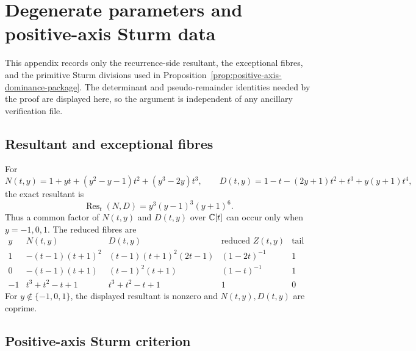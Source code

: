 \section{Degenerate parameters and positive-axis Sturm data}\label{app:degeneracies}

This appendix records only the recurrence-side resultant, the exceptional fibres, and the primitive Sturm divisions used in Proposition~\ref{prop:positive-axis-dominance-package}.  The determinant and pseudo-remainder identities needed by the proof are displayed here, so the argument is independent of any ancillary verification file.

\subsection{Resultant and exceptional fibres}

For
\[
N(t,y)=1+yt+(y^2-y-1)t^2+(y^3-2y)t^3,
\qquad
D(t,y)=1-t-(2y+1)t^2+t^3+y(y+1)t^4,
\]
the exact resultant is
\[
\operatorname{Res}_t(N,D)=y^3(y-1)^3(y+1)^6.
\]
Thus a common factor of \(N(t,y)\) and \(D(t,y)\) over \(\mathbb{C}[t]\) can occur only when \(y=-1,0,1\).  The reduced fibres are
\[
\begin{array}{c|c|c|c|c}
y & N(t,y) & D(t,y) & \text{reduced }Z(t,y) & \text{tail order}\\ \hline
1 & -(t-1)(t+1)^2 & (t-1)(t+1)^2(2t-1) & (1-2t)^{-1} & 1\\
0 & -(t-1)(t+1) & (t-1)^2(t+1) & (1-t)^{-1} & 1\\
-1 & t^3+t^2-t+1 & t^3+t^2-t+1 & 1 & 0
\end{array}
\]
For \(y\notin\{-1,0,1\}\), the displayed resultant is nonzero and \(N(t,y),D(t,y)\) are coprime.

\subsection{Positive-axis Sturm criterion}\label{app:positive-axis-sturm}

